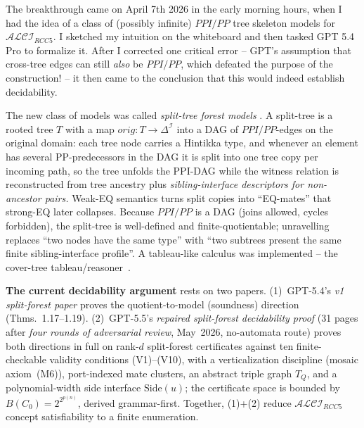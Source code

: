 \documentclass[
]{ceurart}
\theoremstyle{definition}
\newcommand{\ALCIRCC}[1]{\ensuremath{\mathcal{ALCI}_{\mathit{RCC#1}}}}
\begin{document}
The breakthrough came on April 7th 2026 in the early morning hours,
when I had the idea of a class of (possibly infinite)
$\mathit{PPI}/\mathit{PP}$ tree skeleton models for \ALCIRCC{5}.  I
sketched my intuition on the whiteboard \cite{WesselWhiteboard2026}
and then tasked GPT 5.4 Pro to formalize it. After I corrected one
critical error -- GPT's assumption that cross-tree edges can still
\emph{also} be $\mathit{PPI}/\mathit{PP}$, which defeated the purpose
of the construction! -- it then came to the conclusion that this would
indeed establish decidability.

The new class of models was called \emph{split-tree forest models}
\cite{SiblingCompleted, GPT55Repaired}. A split-tree is a rooted tree
$T$ with a map $\mathit{orig}: T \to \Delta^{\mathcal{I}}$ into a DAG
of $\mathit{PPI}/\mathit{PP}$-edges on the original domain: each tree
node carries a Hintikka type, and whenever an element has several
PP-predecessors in the DAG it is split into one tree copy per incoming
path, so the tree unfolds the PPI-DAG while the witness relation is
reconstructed from tree ancestry plus \emph{sibling-interface
descriptors for non-ancestor pairs.}  Weak-EQ semantics turns split
copies into ``EQ-mates'' that strong-EQ later collapses.  Because
$\mathit{PPI}/\mathit{PP}$ is a DAG (joins allowed, cycles forbidden),
the split-tree is well-defined and finite-quotientable; unravelling
replaces ``two nodes have the same type'' with ``two subtrees present
the same finite sibling-interface profile''.  A tableau-like calculus
was implemented -- the cover-tree tableau/reasoner~\cite{CoverTree,
  CoverTreeImpl}.

\textbf{The current decidability argument} rests on two papers.
(1)~GPT-5.4's \emph{v1 split-forest paper} \cite{SiblingCompleted}
proves the quotient-to-model (soundness) direction (Thms.~1.17--1.19).
(2)~GPT-5.5's \emph{repaired split-forest decidability proof}
\cite{GPT55Repaired} (31 pages after \emph{four rounds of adversarial
review}, May~2026, no-automata route) proves both directions in full
on rank-$d$ split-forest certificates against ten finite-checkable
validity conditions (V1)--(V10), with a verticalization discipline
(mosaic axiom~(M6)), port-indexed mate clusters, an abstract triple
graph $T_Q$, and a polynomial-width side interface $\mathrm{Side}(u)$;
the certificate space is bounded by $B(C_0) = 2^{2^{p(n)}}$, derived
grammar-first.  Together, (1)+(2) reduce $\ALCIRCC{5}$ concept
satisfiability to a finite enumeration.
\end{document}
